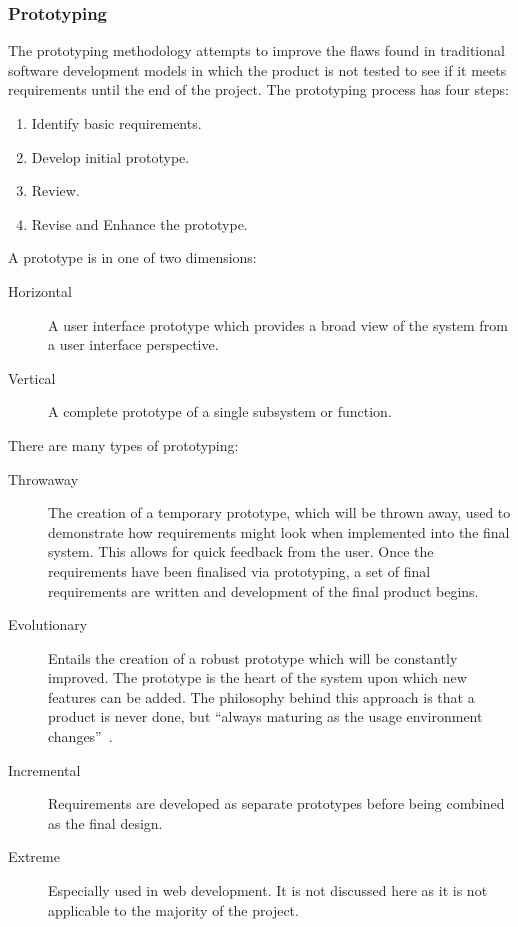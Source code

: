 \documentclass[11pt,a4paper]{article}
\begin{document}
\subsubsection{Prototyping}
The prototyping methodology attempts to improve the flaws found in traditional software development models in which the product is not tested to see if it meets requirements until the end of the project. The prototyping process has four steps:
\begin{enumerate}
\item Identify basic requirements.
\item Develop initial prototype.
\item Review.
\item Revise and Enhance the prototype.
\end{enumerate}

A prototype is in one of two dimensions:
\begin{description}
\item[Horizontal] A user interface prototype which provides a broad view of the system from a user interface perspective. 
\item[Vertical] A complete prototype of a single subsystem or function.
\end{description}

There are many types of prototyping:
\begin{description}
\item[Throwaway] The creation of a temporary prototype, which will be thrown away, used to demonstrate how requirements might look when implemented into the final system. This allows for quick feedback from the user. Once the requirements have been finalised via prototyping, a set of final requirements are written and development of the final product begins.
\item[Evolutionary] Entails the creation of a robust prototype which will be constantly improved. The prototype is the heart of the system upon which new features can be added. The philosophy behind this approach is that a product is never done, but ``always maturing as the usage environment changes''~\cite{spcPrototyping}.
\item[Incremental] Requirements are developed as separate prototypes before being combined as the final design.
\item[Extreme] Especially used in web development. It is not discussed here as it is not applicable to the majority of the project.
\end{description}
\end{document}
